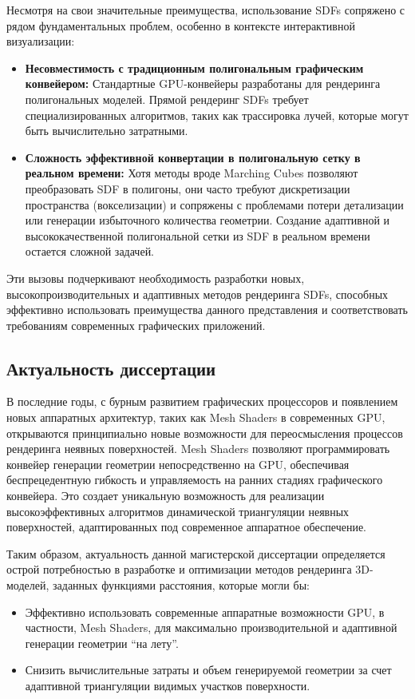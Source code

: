 Несмотря на свои значительные преимущества, использование SDFs сопряжено с рядом фундаментальных проблем, особенно в контексте интерактивной визуализации:

\begin{itemize}
    \item
    \textbf{Несовместимость с традиционным полигональным графическим конвейером:} Стандартные GPU-конвейеры разработаны для рендеринга полигональных моделей. Прямой рендеринг SDFs требует специализированных алгоритмов, таких как трассировка лучей, которые могут быть вычислительно затратными.
    \item
    \textbf{Сложность эффективной конвертации в полигональную сетку в реальном времени:} Хотя методы вроде Marching Cubes позволяют преобразовать SDF в полигоны, они часто требуют дискретизации пространства (вокселизации) и сопряжены с проблемами потери детализации или генерации избыточного количества геометрии. Создание адаптивной и высококачественной полигональной сетки из SDF в реальном времени остается сложной задачей.
\end{itemize}

Эти вызовы подчеркивают необходимость разработки новых, высокопроизводительных и адаптивных методов рендеринга SDFs, способных эффективно использовать преимущества данного представления и соответствовать требованиям современных графических приложений.

\subsection{Актуальность диссертации}
В последние годы, с бурным развитием графических процессоров и появлением новых аппаратных архитектур, таких как Mesh Shaders \cite{NVIDIA_MeshShaders} в современных GPU, открываются принципиально новые возможности для переосмысления процессов рендеринга неявных поверхностей. Mesh Shaders позволяют программировать конвейер генерации геометрии непосредственно на GPU, обеспечивая беспрецедентную гибкость и управляемость на ранних стадиях графического конвейера. Это создает уникальную возможность для реализации высокоэффективных алгоритмов динамической триангуляции неявных поверхностей, адаптированных под современное аппаратное обеспечение.

Таким образом, актуальность данной магистерской диссертации определяется острой потребностью в разработке и оптимизации методов рендеринга 3D-моделей, заданных функциями расстояния, которые могли бы:

\begin{itemize}
    \item
     Эффективно использовать современные аппаратные возможности GPU, в частности, Mesh Shaders, для максимально производительной и адаптивной генерации геометрии ``на лету''.
    \item
     Снизить вычислительные затраты и объем генерируемой геометрии за счет адаптивной триангуляции видимых участков поверхности.
\end{itemize}

